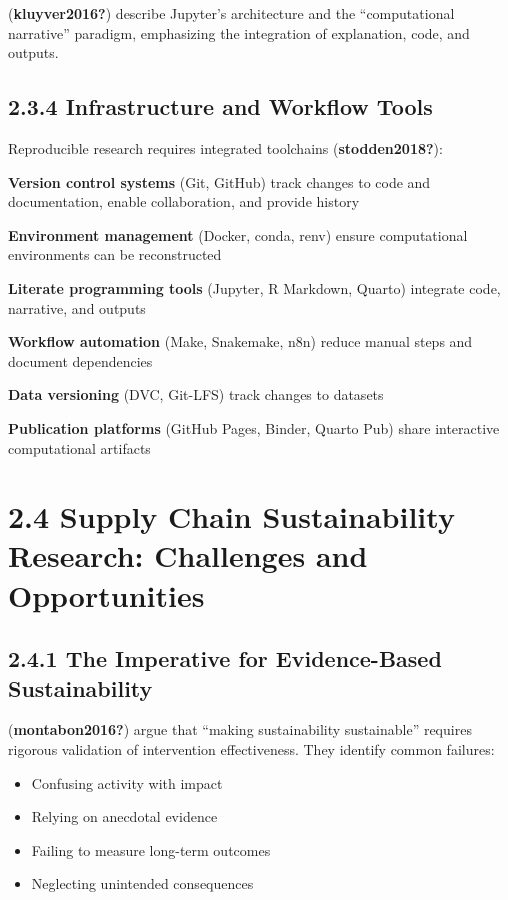 \documentclass[
  oneside,
  open=any]{scrbook}
\providecommand{\tightlist}{%
  \setlength{\itemsep}{0pt}\setlength{\parskip}{0pt}}\usepackage{longtable,booktabs,array}
\begin{document}
(\textbf{kluyver2016?}) describe Jupyter's architecture and the
``computational narrative'' paradigm, emphasizing the integration of
explanation, code, and outputs.

\subsection{2.3.4 Infrastructure and Workflow
Tools}\label{infrastructure-and-workflow-tools}

Reproducible research requires integrated toolchains
(\textbf{stodden2018?}):

\textbf{Version control systems} (Git, GitHub) track changes to code and
documentation, enable collaboration, and provide history

\textbf{Environment management} (Docker, conda, renv) ensure
computational environments can be reconstructed

\textbf{Literate programming tools} (Jupyter, R Markdown, Quarto)
integrate code, narrative, and outputs

\textbf{Workflow automation} (Make, Snakemake, n8n) reduce manual steps
and document dependencies

\textbf{Data versioning} (DVC, Git-LFS) track changes to datasets

\textbf{Publication platforms} (GitHub Pages, Binder, Quarto Pub) share
interactive computational artifacts

\section{2.4 Supply Chain Sustainability Research: Challenges and
Opportunities}\label{supply-chain-sustainability-research-challenges-and-opportunities}

\subsection{2.4.1 The Imperative for Evidence-Based
Sustainability}\label{the-imperative-for-evidence-based-sustainability}

(\textbf{montabon2016?}) argue that ``making sustainability
sustainable'' requires rigorous validation of intervention
effectiveness. They identify common failures:

\begin{itemize}
\tightlist
\item
  Confusing activity with impact
\item
  Relying on anecdotal evidence
\item
  Failing to measure long-term outcomes
\item
  Neglecting unintended consequences
\end{itemize}
\end{document}
